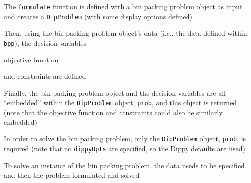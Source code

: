 The \lstinline{formulate} function is defined with a bin packing problem object as input and creates a \lstinline{DipProblem} (with some display options defined)


Then, using the bin packing problem object's data (i.e., the data defined within \lstinline{bpp}), the decision variables

objective function

\newpage
and constraints are defined


Finally, the bin packing problem object and the decision variables are all ``embedded'' within the \lstinline{DipProblem} object, \lstinline{prob}, and this object is returned (note that the objective function and constraints could also be similarly embedded)


In order to solve the bin packing problem, only the \lstinline{DipProblem} object, \lstinline{prob}, is required (note that no \lstinline{dippyOpts} are specified, so the Dippy defaults are used)


To solve an instance of the bin packing problem, the data needs to be specified and then the problem formulated and solved



